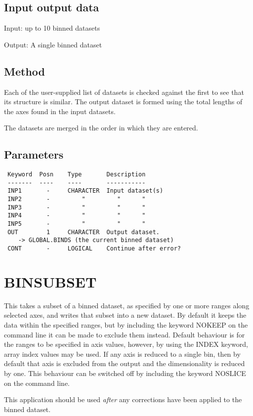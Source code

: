 \documentclass{book}
\renewcommand{\_}{{\tt\char'137}}     %
\begin{document}
\subsection{Input output data}
Input: up to 10 binned datasets

Output: A single binned dataset

\subsection{Method}
Each of the user-supplied list of datasets is checked against the
first to see that its structure is similar. The output dataset is
formed using the total lengths of the axes found in the input
datasets.

The datasets are merged in the order in which they are entered.

\subsection{Parameters}
\begin{verbatim}
 Keyword  Posn    Type       Description
 -------  ----    ----       -----------
 INP1       -     CHARACTER  Input dataset(s)
 INP2       -         "         "      "
 INP3       -         "         "      "
 INP4       -         "         "      "
 INP5       -         "         "      "
 OUT        1     CHARACTER  Output dataset.
    -> GLOBAL.BINDS (the current binned dataset)
 CONT       -     LOGICAL    Continue after error?

\end{verbatim}\section{BINSUBSET}
This takes a subset of a binned dataset, as specified by one or
more ranges along selected axes, and writes that subset into
a new dataset. By default it keeps the data within the specified
ranges, but by including the keyword NOKEEP on the command line
it can be made to exclude them instead. Default behaviour is for
the ranges to be specified in axis values, however, by using the
INDEX keyword, array index values may be used. If any axis is reduced
to a single bin, then by default that axis is excluded from the
output and the dimensionality is reduced by one. This behaviour
can be switched off by including the keyword NOSLICE on the
command line.

This application should be used {\em after} any corrections have been
applied to the binned dataset.
\end{document}
